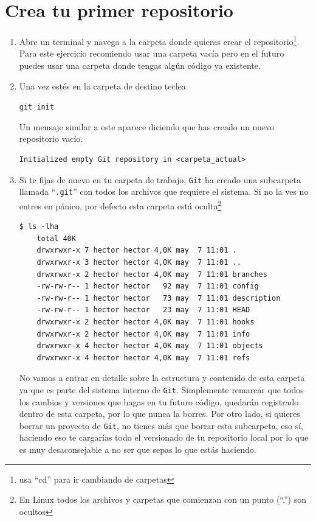 \documentclass[a4paper,11pt]{report}
\newcommand{\cverb}{\Verb}
\begin{document}
    \section{Crea tu primer repositorio}\label{sec:new_repo}
    \begin{enumerate}
      \item Abre un terminal y navega a la carpeta donde quieras crear el repositorio\footnote{usa ``cd'' para ir cambiando de carpetas}. Para este ejercicio recomiendo usar una carpeta vacía pero en el futuro puedes usar una carpeta donde tengas algún código ya existente. 
      
      \item Una vez estés en la carpeta de destino teclea
      
      \cverb+git init+
    
      Un mensaje similar a este aparece diciendo que has creado un nuevo repositorio vacío.
      
      \begin{lstlisting}[style=custom]
  Initialized empty Git repository in <carpeta_actual>
      \end{lstlisting}
      
      \item Si te fijas de nuevo en tu carpeta de trabajo, \verb+Git+ ha creado una subcarpeta llamada ``\verb+.git+'' con todos los archivos que requiere el sistema. Si no la ves no entres en pánico, por defecto esta carpeta está oculta\footnote{En Linux todos los archivos y carpetas que comienzan con un punto (``.'') son ocultos}
    
      \begin{lstlisting}[style=custom]
  $ ls -lha
    total 40K
    drwxrwxr-x 7 hector hector 4,0K may  7 11:01 .
    drwxrwxr-x 3 hector hector 4,0K may  7 11:01 ..
    drwxrwxr-x 2 hector hector 4,0K may  7 11:01 branches
    -rw-rw-r-- 1 hector hector   92 may  7 11:01 config
    -rw-rw-r-- 1 hector hector   73 may  7 11:01 description
    -rw-rw-r-- 1 hector hector   23 may  7 11:01 HEAD
    drwxrwxr-x 2 hector hector 4,0K may  7 11:01 hooks
    drwxrwxr-x 2 hector hector 4,0K may  7 11:01 info
    drwxrwxr-x 4 hector hector 4,0K may  7 11:01 objects
    drwxrwxr-x 4 hector hector 4,0K may  7 11:01 refs
      \end{lstlisting}
    
      No vamos a entrar en detalle sobre la estructura y contenido de esta carpeta ya que es parte del sistema interno de \verb+Git+. Simplemente remarcar que todos los cambios y versiones que hagas en tu futuro código, quedarán registrado dentro de esta carpeta, por lo que nunca la borres. Por otro lado, si quieres borrar un proyecto de \verb+Git+, no tienes más que borrar esta subcarpeta, eso sí, haciendo eso te cargarías todo el versionado de tu repositorio local por lo que es muy desaconsejable a no ser que sepas lo que estás haciendo.


\end{enumerate}
\end{document}
